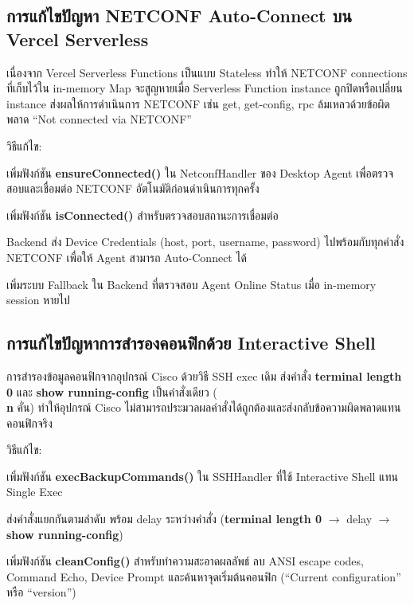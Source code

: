 \subsection{การแก้ไขปัญหา NETCONF Auto-Connect บน Vercel Serverless}
\hspace*{1.3em}
เนื่องจาก Vercel Serverless Functions เป็นแบบ Stateless ทำให้ NETCONF connections ที่เก็บไว้ใน in-memory Map จะสูญหายเมื่อ Serverless Function instance ถูกปิดหรือเปลี่ยน instance ส่งผลให้การดำเนินการ NETCONF เช่น get, get-config, rpc ล้มเหลวด้วยข้อผิดพลาด ``Not connected via NETCONF''

\hspace*{1.3em}
วิธีแก้ไข:
\begin{mycustomitem2}
    \item เพิ่มฟังก์ชัน \textbf{ensureConnected()} ใน NetconfHandler ของ Desktop Agent เพื่อตรวจสอบและเชื่อมต่อ NETCONF อัตโนมัติก่อนดำเนินการทุกครั้ง
    \item เพิ่มฟังก์ชัน \textbf{isConnected()} สำหรับตรวจสอบสถานะการเชื่อมต่อ
    \item Backend ส่ง Device Credentials (host, port, username, password) ไปพร้อมกับทุกคำสั่ง NETCONF เพื่อให้ Agent สามารถ Auto-Connect ได้
    \item เพิ่มระบบ Fallback ใน Backend ที่ตรวจสอบ Agent Online Status เมื่อ in-memory session หายไป
\end{mycustomitem2}

\subsection{การแก้ไขปัญหาการสำรองคอนฟิกด้วย Interactive Shell}
\hspace*{1.3em}
การสำรองข้อมูลคอนฟิกจากอุปกรณ์ Cisco ด้วยวิธี SSH exec เดิม ส่งคำสั่ง \textbf{terminal length 0} และ \textbf{show running-config} เป็นคำสั่งเดียว (\textbf{\\n} คั่น) ทำให้อุปกรณ์ Cisco ไม่สามารถประมวลผลคำสั่งได้ถูกต้องและส่งกลับข้อความผิดพลาดแทนคอนฟิกจริง

\hspace*{1.3em}
วิธีแก้ไข:
\begin{mycustomitem2}
    \item เพิ่มฟังก์ชัน \textbf{execBackupCommands()} ใน SSHHandler ที่ใช้ Interactive Shell แทน Single Exec
    \item ส่งคำสั่งแยกกันตามลำดับ พร้อม delay ระหว่างคำสั่ง (\textbf{terminal length 0} $\rightarrow$ delay $\rightarrow$ \textbf{show running-config})
    \item เพิ่มฟังก์ชัน \textbf{cleanConfig()} สำหรับทำความสะอาดผลลัพธ์ ลบ ANSI escape codes, Command Echo, Device Prompt และค้นหาจุดเริ่มต้นคอนฟิก (``Current configuration'' หรือ ``version'')
\end{mycustomitem2}

